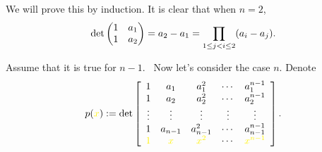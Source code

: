 \documentclass[pdf,9pt]{beamer}
\begin{document}
\begin{frame}[fragile]
    \begin{proofnoend}
       We will prove this by induction. It is clear that when $n=2$,
       \begin{align*}
	   \det \begin{pmatrix} 1 & a_1 \cr 1 & a_2 \end{pmatrix}
	   = a_2-a_1
	   = \prod_{1\leq j<i\leq 2}(a_i-a_j).
       \end{align*}
       \bigskip

       \pause
       Assume that it is true for $n-1$.\pause~ Now let's consider the case $n$.
       Denote
	\begin{align*}
	    p(\textcolor{yellow}{x}) :=
	    \det\left[\begin{array}{ccccc}
        1                     & a_1                   & a_1^2                   & \cdots & a_1^{n-1}     \\
        1                     & a_2                   & a_2^2                   & \cdots & a_2^{n-1}     \\
        \vdots                & \vdots                & \vdots                  & \vdots & \vdots        \\
        1                     & a_{n-1}               & a_{n-1}^2               & \cdots & a_{n-1}^{n-1} \\
        \textcolor{yellow}{1} & \textcolor{yellow}{x} & \textcolor{yellow}{x^2} & \cdots & \textcolor{yellow}{x^{n-1}}
	    \end{array}\right].
	\end{align*}
    \end{proofnoend}

\end{frame}
\end{document}
